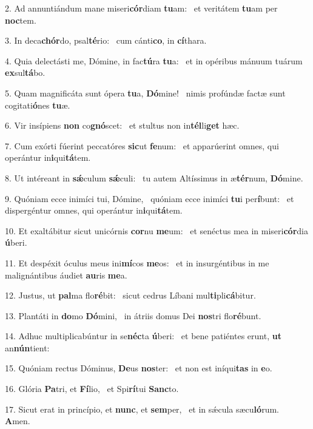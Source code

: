 2. Ad annuntiándum mane miseri\textbf{cór}diam \textbf{tu}am: \ast\  et veritátem \textbf{tu}am per \textbf{noc}tem.\

3. In deca\textbf{chór}do, psal\textbf{té}rio: \ast\  cum cánti\textbf{co}, in \textbf{cí}thara.\

4. Quia delectásti me, Dómine, in fac\textbf{tú}ra \textbf{tu}a: \ast\  et in opéribus mánuum tuárum \textbf{ex}sul\textbf{tá}bo.\

5. Quam magnificáta sunt ópera \textbf{tu}a, \textbf{Dó}mine! \ast\  nimis profúndæ factæ sunt cogitati\textbf{ó}nes \textbf{tu}æ.\

6. Vir insípiens \textbf{non} co\textbf{gnó}scet: \ast\  et stultus non in\textbf{tél}li\textbf{get} hæc.\

7. Cum exórti fúerint peccatóres \textbf{sic}ut \textbf{fe}num: \ast\  et apparúerint omnes, qui operántur in\textbf{i}qui\textbf{tá}tem.\

8. Ut intéreant in \textbf{sǽ}culum \textbf{sǽ}culi: \ast\  tu autem Altíssimus in æ\textbf{tér}num, \textbf{Dó}mine.\

9. Quóniam ecce inimíci tui, Dómine, \dag\  quóniam ecce inimíci \textbf{tu}i per\textbf{í}bunt: \ast\  et dispergéntur omnes, qui operántur in\textbf{i}qui\textbf{tá}tem.\

10. Et exaltábitur sicut unicórnis \textbf{cor}nu \textbf{me}um: \ast\  et senéctus mea in miseri\textbf{cór}dia \textbf{ú}beri.\

11. Et despéxit óculus meus ini\textbf{mí}cos \textbf{me}os: \ast\  et in insurgéntibus in me malignántibus áudiet \textbf{au}ris \textbf{me}a.\

12. Justus, ut \textbf{pal}ma flo\textbf{ré}bit: \ast\  sicut cedrus Líbani mul\textbf{ti}pli\textbf{cá}bitur.\

13. Plantáti in \textbf{do}mo \textbf{Dó}mini, \ast\  in átriis domus Dei \textbf{nos}tri flo\textbf{ré}bunt.\

14. Adhuc multiplicabúntur in se\textbf{néc}ta \textbf{ú}beri: \ast\  et bene patiéntes erunt, \textbf{ut} an\textbf{nún}tient:\

15. Quóniam rectus Dóminus, \textbf{De}us \textbf{nos}ter: \ast\  et non est iníqui\textbf{tas} in \textbf{e}o.\

16. Glória \textbf{Pa}tri, et \textbf{Fí}lio, \ast\  et Spi\textbf{rí}tui \textbf{Sanc}to.\

17. Sicut erat in princípio, et \textbf{nunc}, et \textbf{sem}per, \ast\  et in sǽcula sæcu\textbf{ló}rum. \textbf{A}men.\

